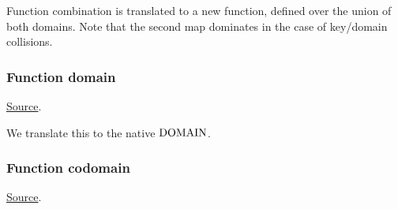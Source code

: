 
\begin{mathpar}
\end{mathpar}
Function combination is translated to a new function, defined over the union of both domains. Note that the second map dominates in the case of key/domain collisions.


\subsubsection{ Function domain}
\href{https://github.com/saltiniroberto/ssf/blob/7ea6e18093d9da3154b4e396dd435549f687e6b9/high_level/common/pythonic_code_generic.py#L121-L122}{Source}.



\begin{mathpar}
\end{mathpar}
We translate this to the \tlap{} native $\DOMAIN$.


\subsubsection{ Function codomain}
\href{https://github.com/saltiniroberto/ssf/blob/7ea6e18093d9da3154b4e396dd435549f687e6b9/high_level/common/pythonic_code_generic.py#L125-L126}{Source}.


